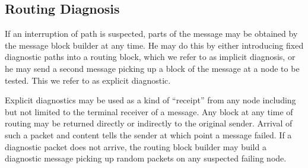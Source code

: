\documentclass[9pt,journal,compsoc]{IEEEtran}
\begin{document}
\subsection{Routing Diagnosis}
If an interruption of path is suspected, parts of the message may be obtained by the message block builder at any time. He may do this by either introducing fixed diagnostic paths into a routing block, which we refer to as implicit diagnosis, or he may send a second message picking up a block of the message at a node to be tested. This we refer to as explicit diagnostic.

Explicit diagnostics may be used as a kind of ``receipt'' from any node including but not limited to the terminal receiver of a message. Any block at any time of routing may be returned directly or indirectly to the original sender. Arrival of such a packet and content tells the sender at which point a message failed. If a diagnostic packet does not arrive, the routing block builder may build a diagnostic message picking up random packets on any suspected failing node.

%
%

\end{document}
